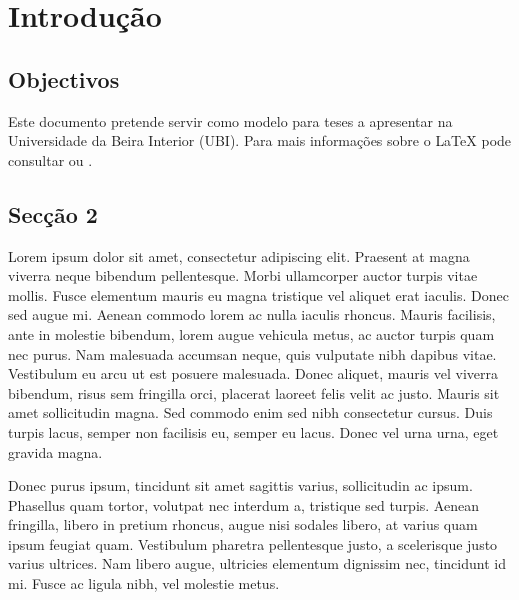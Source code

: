 \chapter{Introdução}
\label{chap:int}





\section{Objectivos}
Este documento pretende servir como modelo para teses a apresentar na Universidade da Beira Interior (UBI). Para mais informações sobre o {\LaTeX} pode consultar \cite{short} ou \cite{eprojects}.

\section{Secção 2}
\label{sec2}
Lorem ipsum dolor sit amet, consectetur adipiscing elit. Praesent at magna viverra neque bibendum pellentesque. Morbi ullamcorper auctor turpis vitae mollis. Fusce elementum mauris eu magna tristique vel aliquet erat iaculis. Donec sed augue mi. Aenean commodo lorem ac nulla iaculis rhoncus. Mauris facilisis, ante in molestie bibendum, lorem augue vehicula metus, ac auctor turpis quam nec purus. Nam malesuada accumsan neque, quis vulputate nibh dapibus vitae. Vestibulum eu arcu ut est posuere malesuada. Donec aliquet, mauris vel viverra bibendum, risus sem fringilla orci, placerat laoreet felis velit ac justo. Mauris sit amet sollicitudin magna. Sed commodo enim sed nibh consectetur cursus. Duis turpis lacus, semper non facilisis eu, semper eu lacus. Donec vel urna urna, eget gravida magna.

Donec purus ipsum, tincidunt sit amet sagittis varius, sollicitudin ac ipsum. Phasellus quam tortor, volutpat nec interdum a, tristique sed turpis. Aenean fringilla, libero in pretium rhoncus, augue nisi sodales libero, at varius quam ipsum feugiat quam. Vestibulum pharetra pellentesque justo, a scelerisque justo varius ultrices. Nam libero augue, ultricies elementum dignissim nec, tincidunt id mi. Fusce ac ligula nibh, vel molestie metus. 

